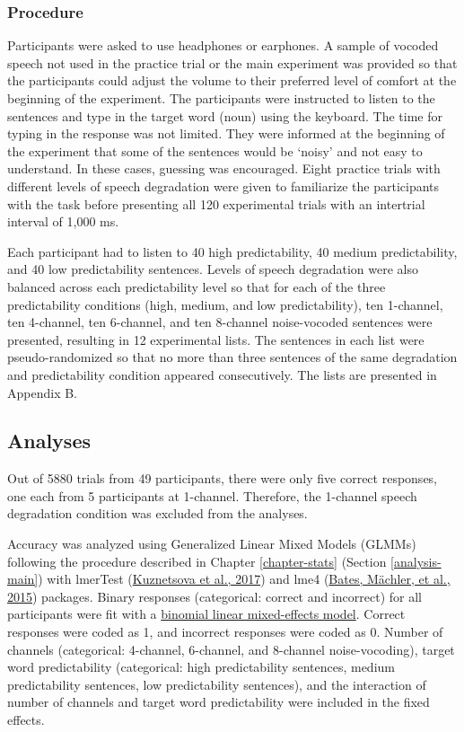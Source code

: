 \documentclass[a4paper, nobind]{templates/ociamthesis}
\begin{document}
\hypertarget{procedure}{%
\subsubsection{Procedure}\label{procedure}}

Participants were asked to use headphones or earphones.
A sample of vocoded speech not used in the practice trial or the main experiment was provided so that the participants could adjust the volume to their preferred level of comfort at the beginning of the experiment.
The participants were instructed to listen to the sentences and type in the target word (noun) using the keyboard.
The time for typing in the response was not limited.
They were informed at the beginning of the experiment that some of the sentences would be `noisy' and not easy to understand.
In these cases, guessing was encouraged.
Eight practice trials with different levels of speech degradation were given to familiarize the participants with the task before presenting all 120 experimental trials with an intertrial interval of 1,000 ms.

Each participant had to listen to 40 high predictability, 40 medium predictability, and 40 low predictability sentences.
Levels of speech degradation were also balanced across each predictability level so that for each of the three predictability conditions (high, medium, and low predictability), ten 1-channel, ten 4-channel, ten 6-channel, and ten 8-channel noise-vocoded sentences were presented, resulting in 12 experimental lists.
The sentences in each list were pseudo-randomized so that no more than three sentences of the same degradation and predictability condition appeared consecutively.
The lists are presented in Appendix B.

\hypertarget{analyses}{%
\subsection{Analyses}\label{analyses}}

Out of 5880 trials from 49 participants, there were only five correct responses, one each from 5 participants at 1-channel.
Therefore, the 1-channel speech degradation condition was excluded from the analyses.

Accuracy was analyzed using Generalized Linear Mixed Models (GLMMs) following the procedure described in Chapter \ref{chapter-stats} (Section \ref{analysis-main}) with lmerTest (\protect\hyperlink{ref-Kuznetsova2017}{Kuznetsova et al., 2017}) and lme4 (\protect\hyperlink{ref-Bates2015}{Bates, Mächler, et al., 2015}) packages.
Binary responses (categorical: correct and incorrect) for all participants were fit with a \protect\hyperlink{binomial-logistic-mixed-effects-model}{binomial linear mixed-effects model}.
Correct responses were coded as 1, and incorrect responses were coded as 0.
Number of channels (categorical: 4-channel, 6-channel, and 8-channel noise-vocoding), target word predictability (categorical: high predictability sentences, medium predictability sentences, low predictability sentences), and the interaction of number of channels and target word predictability were included in the fixed effects.
\end{document}
